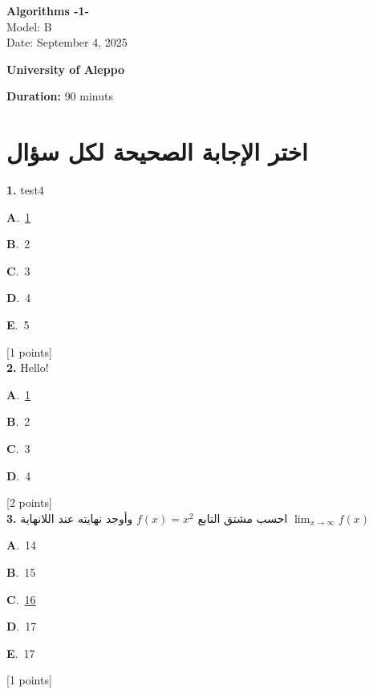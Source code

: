 \documentclass[12pt]{article}
\newcommand{\choice}[3]{%
  \noindent\textbf{#1}.~#2\hfill#3\par\vspace{0.25em}
}
\begin{document}
\begin{flushright}
{\Large \textbf{{\textenglish{Algorithms -1-}}}}\\[0.25em]
{\normalsize \textenglish{Model: }{\textenglish{B}}}\\[0.1em]
{\normalsize \textenglish{Date: }{\textenglish{September 4, 2025}}}
\end{flushright}

\vspace{0.6cm}

\noindent
\begin{minipage}[t]{0.65\textwidth}
  \raggedright
  \textbf{{\textenglish{University of Aleppo}}}\\[0.3em]
\end{minipage}\hfill
\begin{minipage}[t]{0.3\textwidth}
  \raggedleft
  \textenglish{\textbf{Duration: }}{\textenglish{90 minuts}}
\end{minipage}

\vspace{0.9cm}

\section*{اختر الإجابة الصحيحة لكل سؤال}

\noindent \textbf{\textenglish{1.}} {\textenglish{test4}}

\noindent\choice{A}{\underline{{\textenglish{1}}}}{}
\noindent\choice{B}{{\textenglish{2}}}{}
\noindent\choice{C}{{\textenglish{3}}}{}
\noindent\choice{D}{{\textenglish{4}}}{}
\noindent\choice{E}{{\textenglish{5}}}{}
\hfill {\textenglish{[1 points]}}\\[0.5em]

\noindent \textbf{\textenglish{2.}} {\textenglish{Hello!}}

\noindent\choice{A}{\underline{{\textenglish{1}}}}{}
\noindent\choice{B}{{\textenglish{2}}}{}
\noindent\choice{C}{{\textenglish{3}}}{}
\noindent\choice{D}{{\textenglish{4}}}{}
\hfill {\textenglish{[2 points]}}\\[0.5em]

\noindent \textbf{\textenglish{3.}} {\textarabic{احسب مشتق التابع }}\( f(x) = x^2\){\textarabic{ وأوجد نهايته عند اللانهاية }}\(\lim_{x \to \infty}f(x)\)

\noindent\choice{A}{{\textenglish{14}}}{}
\noindent\choice{B}{{\textenglish{15}}}{}
\noindent\choice{C}{\underline{{\textenglish{16}}}}{}
\noindent\choice{D}{{\textenglish{17}}}{}
\noindent\choice{E}{{\textenglish{17}}}{}
\hfill {\textenglish{[1 points]}}\\[0.5em]
\end{document}
